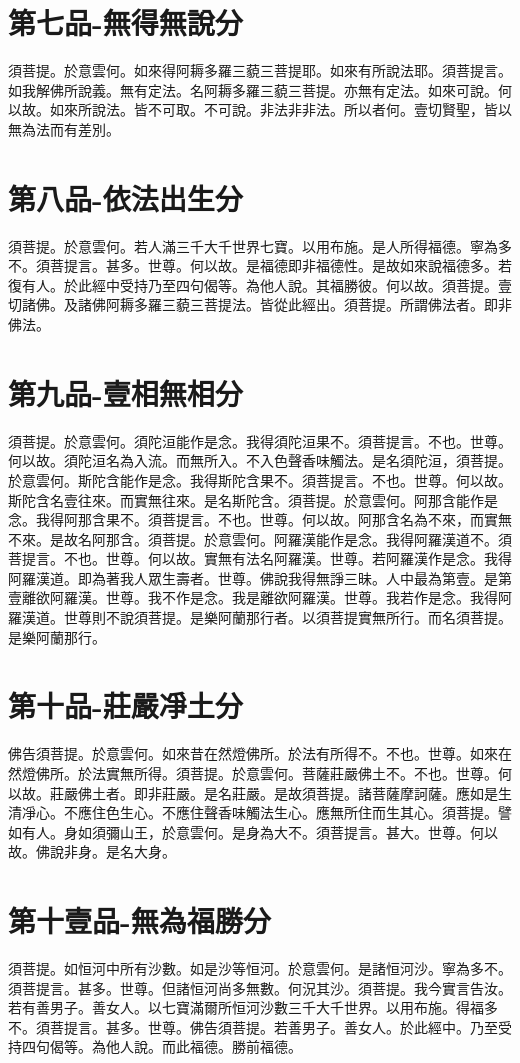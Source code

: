 \documentclass[a6paper, 22pt, twocolumn]{cvertbook}
\begin{document}
\chapter{第七品-無得無說分}
\large 須菩提。於意雲何。如來得阿耨多羅三藐三菩提耶。如來有所說法耶。須菩提言。如我解佛所說義。無有定法。名阿耨多羅三藐三菩提。亦無有定法。如來可說。何以故。如來所說法。皆不可取。不可說。非法非非法。所以者何。壹切賢聖，皆以無為法而有差別。
\chapter{第八品-依法出生分}
\large 須菩提。於意雲何。若人滿三千大千世界七寶。以用布施。是人所得福德。寧為多不。須菩提言。甚多。世尊。何以故。是福德即非福德性。是故如來說福德多。若復有人。於此經中受持乃至四句偈等。為他人說。其福勝彼。何以故。須菩提。壹切諸佛。及諸佛阿耨多羅三藐三菩提法。皆從此經出。須菩提。所謂佛法者。即非佛法。
\chapter{第九品-壹相無相分}
\large 須菩提。於意雲何。須陀洹能作是念。我得須陀洹果不。須菩提言。不也。世尊。何以故。須陀洹名為入流。而無所入。不入色聲香味觸法。是名須陀洹，須菩提。於意雲何。斯陀含能作是念。我得斯陀含果不。須菩提言。不也。世尊。何以故。斯陀含名壹往來。而實無往來。是名斯陀含。須菩提。於意雲何。阿那含能作是念。我得阿那含果不。須菩提言。不也。世尊。何以故。阿那含名為不來，而實無不來。是故名阿那含。須菩提。於意雲何。阿羅漢能作是念。我得阿羅漢道不。須菩提言。不也。世尊。何以故。實無有法名阿羅漢。世尊。若阿羅漢作是念。我得阿羅漢道。即為著我人眾生壽者。世尊。佛說我得無諍三昧。人中最為第壹。是第壹離欲阿羅漢。世尊。我不作是念。我是離欲阿羅漢。世尊。我若作是念。我得阿羅漢道。世尊則不說須菩提。是樂阿蘭那行者。以須菩提實無所行。而名須菩提。是樂阿蘭那行。
\chapter{第十品-莊嚴凈土分}
\large 佛告須菩提。於意雲何。如來昔在然燈佛所。於法有所得不。不也。世尊。如來在然燈佛所。於法實無所得。須菩提。於意雲何。菩薩莊嚴佛土不。不也。世尊。何以故。莊嚴佛土者。即非莊嚴。是名莊嚴。是故須菩提。諸菩薩摩訶薩。應如是生清凈心。不應住色生心。不應住聲香味觸法生心。應無所住而生其心。須菩提。譬如有人。身如須彌山王，於意雲何。是身為大不。須菩提言。甚大。世尊。何以故。佛說非身。是名大身。

\chapter{第十壹品-無為福勝分}
\large 須菩提。如恒河中所有沙數。如是沙等恒河。於意雲何。是諸恒河沙。寧為多不。須菩提言。甚多。世尊。但諸恒河尚多無數。何況其沙。須菩提。我今實言告汝。若有善男子。善女人。以七寶滿爾所恒河沙數三千大千世界。以用布施。得福多不。須菩提言。甚多。世尊。佛告須菩提。若善男子。善女人。於此經中。乃至受持四句偈等。為他人說。而此福德。勝前福德。
\end{document}
